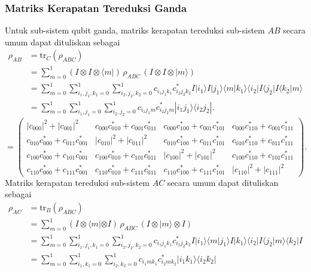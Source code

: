 \subsubsection{Matriks Kerapatan Tereduksi Ganda}
\par
Untuk sub-sistem qubit ganda, matriks kerapatan tereduksi sub-sistem $AB$ secara umum dapat dituliskan sebagai
\begin{align*}
	\rho_{AB} &= \mathrm{tr}_C(\rho_{ABC}) \nonumber \\
	&= \sum_{m=0}^{1} (I \otimes I \otimes \langle m|)\, \rho_{ABC}\, (I \otimes I \otimes |m\rangle) \nonumber \\
	&= \sum_{m=0}^{1} \sum_{i_1,j_1,k_1=0}^{1} \sum_{i_2,j_2,k_2=0}^{1}
	c_{i_1 j_1 k_1}c^{*}_{i_2 j_2 k_2}
	I |i_1\rangle I |j_1\rangle \langle m|k_1\rangle
	\langle i_2| I \langle j_2| I \langle k_2|m\rangle \nonumber \\
	&= \sum_{m=0}^{1} \sum_{i_1,j_1=0}^{1} \sum_{i_2,j_2=0}^{1}
	c_{i_1 j_1 m}c^{*}_{i_2 j_2 m}
	|i_1 j_1\rangle \langle i_2 j_2|.
\end{align*}
\begin{equation}
	=
	\begin{pmatrix}
		|c_{000}|^2+|c_{001}|^2 &
		c_{000}c_{010}^{*}+c_{001}c_{011}^{*} &
		c_{000}c_{100}^{*}+c_{001}c_{101}^{*} &
		c_{000}c_{110}^{*}+c_{001}c_{111}^{*}
		\\[0.3em]
		c_{010}c_{000}^{*}+c_{011}c_{001}^{*} &
		|c_{010}|^2+|c_{011}|^2 &
		c_{010}c_{100}^{*}+c_{011}c_{101}^{*} &
		c_{010}c_{110}^{*}+c_{011}c_{111}^{*}
		\\[0.3em]
		c_{100}c_{000}^{*}+c_{101}c_{001}^{*} &
		c_{100}c_{010}^{*}+c_{101}c_{011}^{*} &
		|c_{100}|^2+|c_{101}|^2 &
		c_{100}c_{110}^{*}+c_{101}c_{111}^{*}
		\\[0.3em]
		c_{110}c_{000}^{*}+c_{111}c_{001}^{*} &
		c_{110}c_{010}^{*}+c_{111}c_{011}^{*} &
		c_{110}c_{100}^{*}+c_{111}c_{101}^{*} &
		|c_{110}|^2+|c_{111}|^2
	\end{pmatrix}.
\end{equation}
Matriks kerapatan tereduksi sub-sistem $AC$ secara umum dapat dituliskan sebagai
\begin{align*}
	\rho_{AC} &= \mathrm{tr}_B(\rho_{ABC}) \nonumber \\
	&= \sum_{m=0}^{1} (I \otimes \langle m| \otimes I)\, \rho_{ABC}\, (I \otimes |m\rangle \otimes I) \nonumber \\
	&= \sum_{m=0}^{1} \sum_{i_1,j_1,k_1=0}^{1} \sum_{i_2,j_2,k_2=0}^{1}
	c_{i_1 j_1 k_1}c^{*}_{i_2 j_2 k_2}
	I |i_1\rangle \langle m|j_1\rangle I |k_1\rangle
	\langle i_2| I \langle j_2|m\rangle \langle k_2| I \nonumber \\
	&= \sum_{m=0}^{1} \sum_{i_1,k_1=0}^{1} \sum_{i_2,k_2=0}^{1}
	c_{i_1 m k_1}c^{*}_{i_2 m k_2}
	|i_1 k_1\rangle \langle i_2 k_2|
\end{align*}
